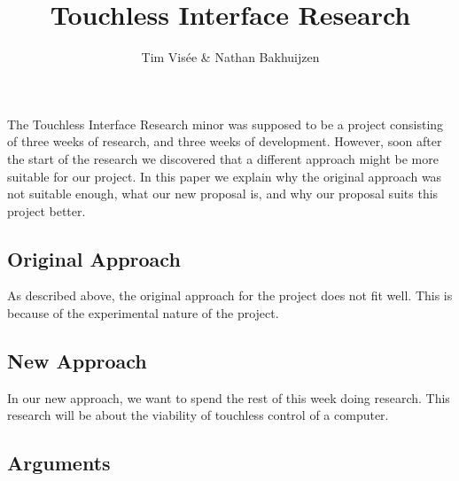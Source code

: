 \documentclass[a4paper]{article}
\title{Touchless Interface Research}
\author{Tim Visée \& Nathan Bakhuijzen}
\begin{document}

\maketitle

The Touchless Interface Research minor was supposed to be a project consisting
of three weeks of research, and three weeks of development. However, soon after
the start of the research we discovered that a different approach might be more
suitable for our project. In this paper we explain why the original approach was
not suitable enough, what our new proposal is, and why our proposal suits this
project better.

\subsection*{Original Approach}
As described above, the original approach for the project does not fit well.
This is because of the experimental nature of the project.



\subsection*{New Approach}
In our new approach, we want to spend the rest of this week doing research. This
research will be about the viability of touchless control of a computer.

\subsection*{Arguments}
\end{document}
